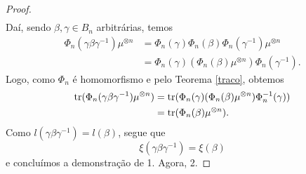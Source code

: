 \begin{proof}
\begin{align*}
		\end{align*}
		Daí, sendo $\beta, \gamma\in B_n$ arbitrárias, temos
		\begin{align*}
    		\Phi_n(\gamma\beta\gamma^{-1}) \mu^{\otimes n} 
    		&= \Phi_n(\gamma)\Phi_n(\beta)\Phi_n(\gamma^{-1})\mu^{\otimes n} \\
    		&= \Phi_n(\gamma)(\Phi_n(\beta)\mu^{\otimes n})\Phi_n(\gamma^{-1}).
		\end{align*}
		Logo, como $\Phi_n$ é homomorfismo e pelo Teorema \ref{traco}, obtemos
		\begin{align*}
    		\operatorname{tr}(\Phi_n(\gamma\beta\gamma^{-1}) \mu^{\otimes n})	
    		&= \operatorname{tr}(\Phi_n(\gamma)(\Phi_n(\beta)\mu^{\otimes n})\Phi_n^{-1}(\gamma)) \\
    		&= \operatorname{tr}(\Phi_n(\beta)\mu^{\otimes n}).
		\end{align*}
		Como $l(\gamma\beta\gamma^{-1}) = l(\beta)$, segue que
		\begin{equation*}
		    \xi(\gamma\beta\gamma^{-1}) = \xi(\beta)
		\end{equation*}
		e concluímos a demonstração de 1. Agora, 2.
		

\end{proof}
